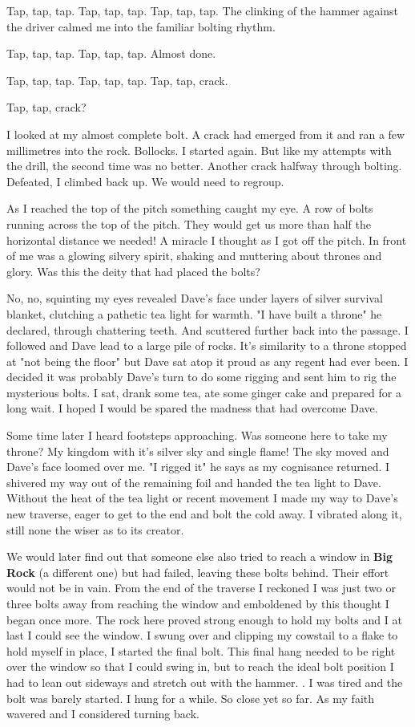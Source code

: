 Tap, tap, tap. Tap, tap, tap. Tap, tap, tap. The clinking of the hammer against the driver calmed me into the familiar bolting rhythm. 

Tap, tap, tap. Tap, tap, tap. Almost done. 

Tap, tap, tap. Tap, tap, tap. Tap, tap, crack. 

Tap, tap, crack? 

I looked at my almost complete bolt. A crack had emerged from it and ran a few millimetres into the rock. Bollocks. I started again. But like my attempts with the drill, the second time was no better. Another crack halfway through bolting. Defeated, I climbed back up. We would need to regroup.

As I reached the top of the pitch something caught my eye. A row of bolts running across the top of the pitch. They would get us more than half the horizontal distance we needed! A miracle I thought as I got off the pitch. In front of me was a glowing silvery spirit, shaking and muttering about thrones and glory. Was this the deity that had placed the bolts? 

No, no, squinting my eyes revealed Dave's face under layers of silver survival blanket, clutching a pathetic tea light for warmth. "I have built a throne" he declared, through chattering teeth. And scuttered further back into the passage. I followed and Dave lead to a large pile of rocks. It's similarity to a throne stopped at "not being the floor" but Dave sat atop it proud as any regent had ever been. I decided it was probably Dave's turn to do some rigging and sent him to rig the mysterious bolts. I sat, drank some tea, ate some ginger cake and prepared for a long wait. I hoped I would be spared the madness that had overcome Dave.



Some time later I heard footsteps approaching. Was someone here to take my throne? My kingdom with it's silver sky and single flame! The sky moved and Dave's face loomed over me.  "I rigged it" he says as my cognisance returned. I shivered my way out of the remaining foil and handed the tea light to Dave. Without the heat of the tea light or recent movement I made my way to Dave's new traverse, eager to get to the end and bolt the cold away. I vibrated along it, still none the wiser as to its creator. 

We would later find out that someone else also tried to reach a window in \textbf{Big Rock} (a different one) but had failed, leaving these bolts behind. Their effort would not be in vain. From the end of the traverse I reckoned I was just two or three bolts away from reaching the window and emboldened by this thought I began once more. The rock here proved strong enough to hold my bolts and I at last I could see the window. I swung over and clipping my cowstail to a flake to hold myself in place, I started the final bolt. This final hang needed to be right over the window so that I could swing in, but to reach the ideal bolt position I had to lean out sideways and stretch out with the hammer. . I was tired and the bolt was barely started. I hung for a while. So close yet so far. As my faith wavered and I considered turning back.


